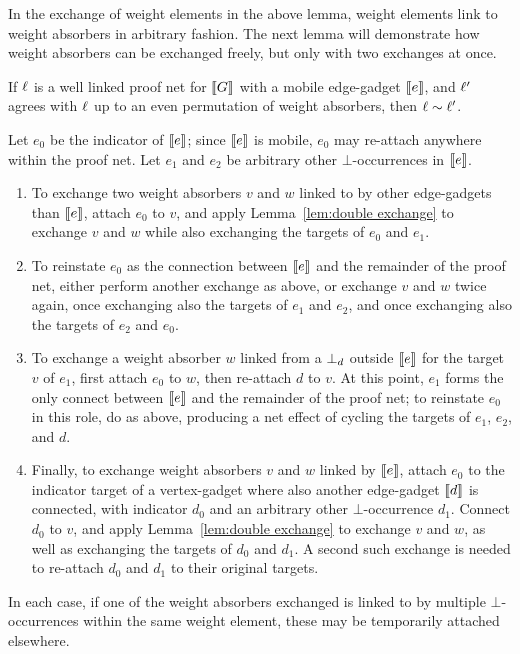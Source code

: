 \documentclass[conference]{IEEEtran}
\begin{document}
In the exchange of weight elements in the above lemma, weight elements link to weight absorbers in arbitrary fashion.
%
The next lemma will demonstrate how weight absorbers can be exchanged freely, but only with two exchanges at once. 



\begin{lemma}
\label{lem:permute weight absorbers}
If $\ell$ is a well linked proof net for $\llbracket G\rrbracket$ with a mobile edge-gadget $\llbracket e\rrbracket$, and $\ell'$ agrees with $\ell$ up to an even permutation of weight absorbers, then $\links\perm\links'$.
\end{lemma}

\begin{IEEEproof}
Let $e_0$ be the indicator of $\llbracket e\rrbracket$; since $\llbracket e\rrbracket$ is mobile, $e_0$ may re-attach anywhere within the proof net.
%
Let $e_1$ and $e_2$ be arbitrary other $\bot$-occurrences in $\llbracket e\rrbracket$.

\begin{enumerate}

	\item
To exchange two weight absorbers $v$ and $w$ linked to by other edge-gadgets than $\llbracket e\rrbracket$, attach $e_0$ to $v$, and apply Lemma~\ref{lem:double exchange} to exchange $v$ and $w$ while also exchanging the targets of $e_0$ and $e_1$.

	\item
To reinstate $e_0$ as the connection between $\llbracket e\rrbracket$ and the remainder of the proof net, either perform another exchange as above, or exchange $v$ and $w$ twice again, once exchanging also the targets of $e_1$ and $e_2$, and once exchanging also the targets of $e_2$ and $e_0$.

	\item
To exchange a weight absorber $w$ linked from a $\bot_{d}$ outside $\llbracket e\rrbracket$ for the target $v$ of $e_1$, first attach $e_0$ to $w$, then re-attach $d$ to $v$.
%
At this point, $e_1$ forms the only connect between $\llbracket e\rrbracket$ and the remainder of the proof net; to reinstate $e_0$ in this role, do as above, producing a net effect of cycling the targets of $e_1$, $e_2$, and $d$.

	\item
Finally, to exchange weight absorbers $v$ and $w$ linked by $\llbracket e\rrbracket$, attach $e_0$ to the indicator target of a vertex-gadget where also another edge-gadget $\llbracket d\rrbracket$ is connected, with indicator $d_0$ and an arbitrary other $\bot$-occurrence $d_1$.
%
Connect $d_0$ to $v$, and apply Lemma~\ref{lem:double exchange} to exchange $v$ and $w$, as well as exchanging the targets of $d_0$ and $d_1$.
%
A second such exchange is needed to re-attach $d_0$ and $d_1$ to their original targets.

\end{enumerate}

In each case, if one of the weight absorbers exchanged is linked to by multiple $\bot$-occurrences within the same weight element, these may be temporarily attached elsewhere.
%
\end{IEEEproof}
\end{document}
